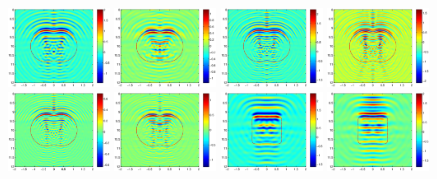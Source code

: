 \documentclass[12pt]{iopart}
\begin{document}
\begin{figure}
	\includegraphics[width=0.24\textwidth]{./graphic/peanut_3pi_impedance_1.eps}
	\includegraphics[width=0.24\textwidth]{./graphic/peanut_3pi_transmission.eps}
	\includegraphics[width=0.24\textwidth]{./graphic/peanut_4pi.eps}
	\includegraphics[width=0.24\textwidth]{./graphic/peanut_4pi_neumann.eps}
	\includegraphics[width=0.24\textwidth]{./graphic/peanut_4pi_impedance_1.eps}
	\includegraphics[width=0.24\textwidth]{./graphic/peanut_4pi_transmission.eps}
	\includegraphics[width=0.24\textwidth]{./graphic/rectangle_2pi.eps}
	\includegraphics[width=0.24\textwidth]{./graphic/rectangle_2pi_neumann.eps}

\end{figure}
\end{document}
